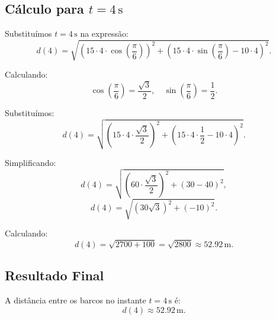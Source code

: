 \subsection*{Cálculo para \(t = 4 \, \text{s}\)}
Substituímos \(t = 4 \, \text{s}\) na expressão:
\[
d(4) = \sqrt{\left(15 \cdot 4 \cdot \cos\left(\frac{\pi}{6}\right)\right)^2 + \left(15 \cdot 4 \cdot \sin\left(\frac{\pi}{6}\right) - 10 \cdot 4\right)^2}.
\]

Calculando:
\[
\cos\left(\frac{\pi}{6}\right) = \frac{\sqrt{3}}{2}, \quad \sin\left(\frac{\pi}{6}\right) = \frac{1}{2}.
\]

Substituímos:
\[
d(4) = \sqrt{\left(15 \cdot 4 \cdot \frac{\sqrt{3}}{2}\right)^2 + \left(15 \cdot 4 \cdot \frac{1}{2} - 10 \cdot 4\right)^2}.
\]

Simplificando:
\[
d(4) = \sqrt{\left(60 \cdot \frac{\sqrt{3}}{2}\right)^2 + \left(30 - 40\right)^2},
\]
\[
d(4) = \sqrt{\left(30\sqrt{3}\right)^2 + (-10)^2}.
\]

Calculando:
\[
d(4) = \sqrt{2700 + 100} = \sqrt{2800} \approx 52.92 \, \text{m}.
\]

\subsection*{Resultado Final}
A distância entre os barcos no instante \(t = 4 \, \text{s}\) é:
\[
d(4) \approx 52.92 \, \text{m}.
\]
